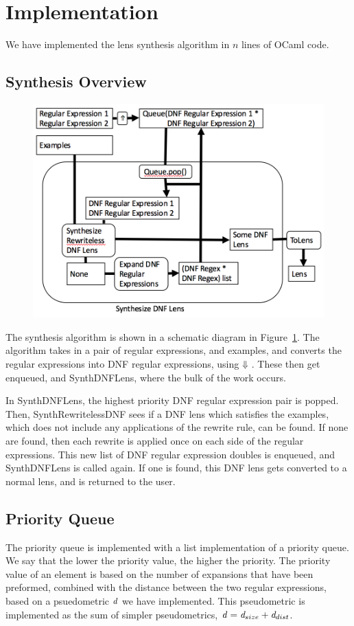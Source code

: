 \section{Implementation}
We have implemented the lens synthesis algorithm in $n$ lines of OCaml code.

\subsection{Synthesis Overview}
\begin{figure}
\includegraphics[scale=.5]{synth-lens-schematic.png}
\label{fig:synth-lens-schematic}
\end{figure}
The synthesis algorithm is shown in a schematic diagram in 
Figure~\ref{fig:synth-lens-schematic}.  The algorithm takes in a pair of
regular expressions, and examples, and converts the regular expressions into
DNF regular expressions, using $\Downarrow{}$.
These then get enqueued, and SynthDNFLens, where the bulk of the work
occurs.

In SynthDNFLens, the highest priority DNF regular expression pair is popped.
Then, SynthRewritelessDNF sees if a DNF lens which satisfies the examples, which
does not include any applications of the rewrite rule, can be found.
If none are found, then each rewrite is applied once on each side of the regular
expressions.
This new list of DNF regular expression doubles is enqueued, and SynthDNFLens is
called again.
If one is found, this DNF lens gets converted to a normal lens, and is returned
to the user.

\subsection{Priority Queue}
The priority queue is implemented with a list implementation of a priority queue.
We say that the lower the priority value, the higher the priority.
The priority value of an element is based on the number of expansions that have been
preformed, combined with the distance between the two regular expressions, based
on a psuedometric $\mathit{d}$ we have implemented.  This pseudometric is implemented
as the sum of simpler pseudometrics,
$\mathit{d} = \mathit{d}_{size}+\mathit{d}_{dist}$.

